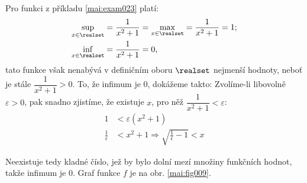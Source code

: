 \begin{mdframed}[style=mdexam]
  \begin{example}\label{mai:exam021} 
    Pro funkci z příkladu \ref{mai:exam023} platí:
    \begin{align*}
      \sup_{x\in\realset}&=\frac{1}{x^2+1}=\max_{x\in\realset}=\frac{1}{x^2+1}=1;   \\
      \inf_{x\in\realset}&=\frac{1}{x^2+1}=0,
    \end{align*}
    tato funkce však nenabývá v definičním oboru \(\realset\) nejmenší hodnoty, neboť je stále 
    $\dfrac{1}{x^2+1}>0$. To, že infimum je $0$, dokážeme takto: Zvolíme-li libovolně 
    $\varepsilon>0$, pak snadno zjistíme, že existuje \(x\), pro něž 
    $\dfrac{1}{x^2+1}<\varepsilon$:
    \begin{align*}
      1                  &< \varepsilon(x^2+1) \\
      \frac{1}{\epsilon} &< x^2+1 \Rightarrow \sqrt{\frac{1}{\epsilon}-1} < x
    \end{align*} 
    
    {\centering
    \captionsetup{type=figure}
    \label{mai:fig009}
    \par}
    
    Neexistuje tedy kladné číslo, jež by bylo dolní mezí množiny funkčních hodnot, takže infimum je 
    $0$. Graf funkce $f$ je na obr. \ref{mai:fig009}.
  \end{example}
\end{mdframed}